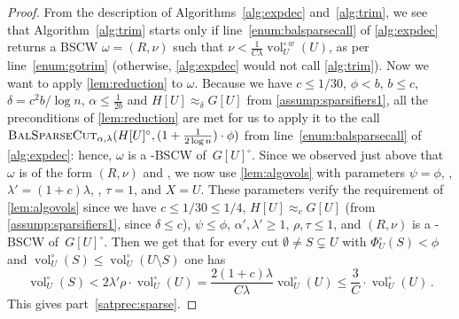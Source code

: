\documentclass[epsfig,letter,11pt]{article}
\numberwithin{equation}{section}
\newcommand{\unvolc}[2]{\operatorname{vol}_{#2}^\circ (#1)}
\newcommand{\wvolc}[2]{\operatorname{vol}_{#2}^{\circ \,w} (#1)}
\newcommand{\unspc}[2]{\Phi_{#2}^\circ (#1)}
\newcommand{\bsc}{\textsc{BalSparseCut}_{\alpha,\lambda}}
\begin{document}
\begin{proof}
	From the description of Algorithms~\ref{alg:expdec} and~\ref{alg:trim}, we see that Algorithm~\ref{alg:trim} starts only if line~\eqref{enum:balsparsecall} of \cref{alg:expdec} returns a BSCW $\omega=(R,\nu)$ such that $\nu < \frac{1}{C \lambda}\wvolc{U}{U}$, as per line~\eqref{enum:gotrim} (otherwise, \cref{alg:expdec} would not call \cref{alg:trim}). Now we want to apply \cref{lem:reduction} to $\omega$. Because we have $c\le 1/30$, $\phi < b$, $b \le c$, $\delta=c^2 b/\log n $, $\alpha \le \frac{1}{2b}$ and $H[U] \approx_{\delta} G[U]$ from \cref{assump:sparsifiers1}, all the preconditions of \cref{lem:reduction} are met for us to apply it to the call $\bsc(H[U]^\circ, (1+\frac{1}{2\log n}) \cdot \phi)$ from line~\eqref{enum:balsparsecall} of \cref{alg:expdec}: hence, $\omega$ is a  -BSCW of~$G[U]^\circ$. Since we observed just above that $\omega$ is of the form $(R,\nu)$ and \smash{$\nu < \frac{1}{C \lambda}\wvolc{U}{U}$}, we now use \cref{lem:algovols} with parameters $\psi=\phi$, , $\lambda' =(1+c)\lambda$, , $\tau=1$, and $X=U$. These parameters verify the requirement of \cref{lem:algovols} since we have $ c\le 1/30 \le 1/4$, $H[U] \approx_{c} G[U]$ (from \cref{assump:sparsifiers1}, since $\delta \le c$), $\psi \le \phi$, $\alpha',\lambda' \ge 1$, $\rho,\tau \le 1$, and  $(R,\nu)$ is a -BSCW of~$G[U]^\circ$. Then we get that for every cut $\emptyset \neq  S \subsetneq U$ with $\unspc{S}{U} < \phi$ and $ \unvolc{S}{U} \le \unvolc{U \setminus S}{U}$ one has
	\begin{equation*}
		\unvolc{S}{U} < 2\lambda' \rho \cdot \unvolc{U}{U} = \frac{2(1+c)\lambda}{C\lambda}  \unvolc{U}{U} \leq \frac{3}{C} \cdot \unvolc{U}{U} \, .
	\end{equation*}
	This gives part~\eqref{satprec:sparse}.
	

\end{proof}
\end{document}
